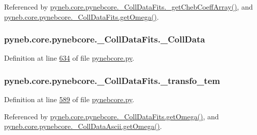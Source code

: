 Referenced by \hyperlink{pynebcore_8py_source_l00734}{pyneb.\+core.\+pynebcore.\+\_\+\+Coll\+Data\+Fits.\+\_\+get\+Cheb\+Coeff\+Array()}, and \hyperlink{pynebcore_8py_source_l00811}{pyneb.\+core.\+pynebcore.\+\_\+\+Coll\+Data\+Fits.\+get\+Omega()}.

\hypertarget{classpyneb_1_1core_1_1pynebcore_1_1___coll_data_fits_a34f70aba84a783d1a5a8633f797f7bb1}{}
\subsubsection[{\+\_\+\+Coll\+Data}]{\setlength{\rightskip}{0pt plus 5cm}pyneb.\+core.\+pynebcore.\+\_\+\+Coll\+Data\+Fits.\+\_\+\+Coll\+Data\hspace{0.3cm}{\ttfamily [private]}}\label{classpyneb_1_1core_1_1pynebcore_1_1___coll_data_fits_a34f70aba84a783d1a5a8633f797f7bb1}


Definition at line \hyperlink{pynebcore_8py_source_l00634}{634} of file \hyperlink{pynebcore_8py_source}{pynebcore.\+py}.

\hypertarget{classpyneb_1_1core_1_1pynebcore_1_1___coll_data_fits_afa9318fd2557709e968682f47cefa379}{}
\subsubsection[{\+\_\+transfo\+\_\+tem}]{\setlength{\rightskip}{0pt plus 5cm}pyneb.\+core.\+pynebcore.\+\_\+\+Coll\+Data\+Fits.\+\_\+transfo\+\_\+tem\hspace{0.3cm}{\ttfamily [private]}}\label{classpyneb_1_1core_1_1pynebcore_1_1___coll_data_fits_afa9318fd2557709e968682f47cefa379}


Definition at line \hyperlink{pynebcore_8py_source_l00589}{589} of file \hyperlink{pynebcore_8py_source}{pynebcore.\+py}.



Referenced by \hyperlink{pynebcore_8py_source_l00811}{pyneb.\+core.\+pynebcore.\+\_\+\+Coll\+Data\+Fits.\+get\+Omega()}, and \hyperlink{pynebcore_8py_source_l01063}{pyneb.\+core.\+pynebcore.\+\_\+\+Coll\+Data\+Ascii.\+get\+Omega()}.

